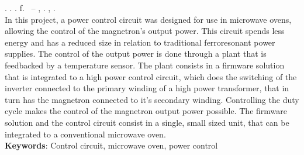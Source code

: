 
\begin{resumo}[ABSTRACT]
\begin{SingleSpacing}

\imprimirautorcitacao. \imprimirtitleabstract. \imprimirdata. \pageref {LastPage} f. \imprimirprojeto\ – \imprimirprograma, \imprimirinstituicao. \imprimirlocal, \imprimirdata.\\


In this project, a power control circuit was designed for use in microwave ovens, allowing the control of the magnetron's output power. This circuit spends less energy and has a reduced size in relation to traditional ferroresonant power supplies. The control of the output power is done through a plant that is feedbacked by a temperature sensor. The plant consists in a firmware solution that is integrated to a high power control circuit, which does the switching of the inverter connected to the primary winding of a high power transformer, that in turn has the magnetron connected to it’s secondary winding. Controlling the duty cycle makes the control of the magnetron output power possible. The firmware solution and the control circuit consist in a single, small sized unit, that can be integrated to a conventional microwave oven.\\


\textbf{Keywords}: Control circuit, microwave oven, power control 

\end{SingleSpacing}
\end{resumo}

